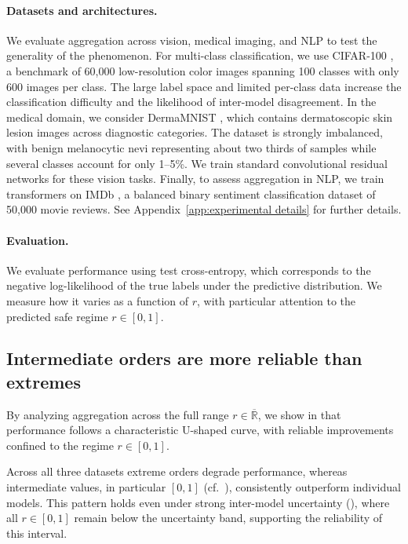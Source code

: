 \documentclass[accepted]{uai2026} %
\newcommand{\R}{\mathbb{R}}
\begin{document}
\paragraph{Datasets and architectures.} We evaluate aggregation across vision, medical imaging, and NLP to test the generality of the phenomenon. For multi-class classification, we use CIFAR-100 \citep{krizhevsky2009learning}, a benchmark of 60,000 low-resolution color images spanning 100 classes with only 600 images per class. The large label space and limited per-class data increase the classification difficulty and the likelihood of inter-model disagreement. In the medical domain, we consider DermaMNIST \citep{yang2023medmnist}, which contains dermatoscopic skin lesion images across  diagnostic categories. The dataset is strongly imbalanced, with benign melanocytic nevi representing about two thirds of samples while several classes account for only 1–5\%. We train standard convolutional residual networks \citep{he2016deep,zagoruyko2016wide} for these vision tasks. Finally, to assess aggregation in NLP, we train transformers \citep{vaswani2017attention} on IMDb \citep{maas2011learning}, a balanced binary sentiment classification dataset of 50,000 movie reviews. See Appendix~\ref{app:experimental details} for further details.


\paragraph{Evaluation.} We evaluate performance using test cross-entropy, which corresponds to the negative log-likelihood of the true labels under the predictive distribution. We measure how it varies as a function of $r$, with particular attention to the predicted safe regime $r \in [0,1]$.

\subsection{Intermediate orders are more reliable than extremes}


By analyzing aggregation across the full range $r \in \overline{\R}$, we show in  that performance follows a characteristic  U-shaped curve, with reliable improvements confined to the regime $r \in [0,1]$.

Across all three datasets extreme orders degrade performance, whereas intermediate values, in particular $[0,1]$ (cf.~), consistently outperform individual models. This pattern holds even under strong inter-model uncertainty (), where all $r \in [0,1]$ remain below the uncertainty band, supporting the reliability of this interval.
\end{document}
